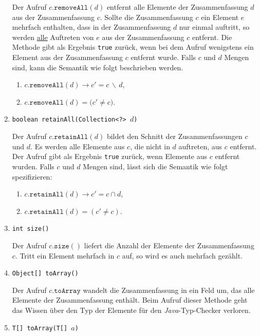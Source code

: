 \begin{enumerate}
      Der Aufruf $c.\mathtt{removeAll}(d)$ entfernt alle Elemente der Zusammenfassung $d$
      aus der Zusammenfassung $c$.  Sollte die Zusammenfassung $c$ ein Element $e$ mehrfach
      enthalten, dass in der Zusammenfassung $d$ nur einmal auftritt, so werden
      \underline{alle} Auftreten von $e$ aus der Zusammenfassung $c$ entfernt.  Die Methode gibt als Ergebnis
      \texttt{true} zur\"uck, wenn bei dem Aufruf wenigstens ein Element aus der
      Zusammenfassung $c$ entfernt wurde.
      Falls $c$ und $d$ Mengen sind, kann die Semantik wie folgt beschrieben werden.
      \begin{enumerate}
      \item $c.\mathtt{removeAll}(d) \rightarrow c' = c \,\backslash\, d$,
      \item $c.\mathtt{removeAll}(d) = \bigl(c' \not= c\bigr)$.
      \end{enumerate}
\item \texttt{boolean retainAll(Collection<?> $d$)}

      Der Aufruf $c.\mathtt{retainAll}(d)$ bildet den Schnitt der Zusammenfassungen
      $c$ und $d$.  Es werden alle Elemente aus $c$, die nicht in $d$ auftreten, aus $c$
      entfernt.  Der Aufruf gibt als Ergebnis \texttt{true} zur\"uck, wenn Elemente aus 
      $c$ entfernt wurden.  Falls $c$ und $d$ Mengen sind, l\"asst sich die Semantik wie
      folgt spezifizieren:
      \begin{enumerate}
      \item $c.\mathtt{retainAll}(d) \rightarrow c' = c \cap d$,
      \item $c.\mathtt{retainAll}(d) = (c' \not= c)$.
      \end{enumerate}
\item \texttt{int size()}

      Der Aufruf $c.\mathtt{size}()$ liefert die Anzahl der Elemente der Zusammenfassung
      $c$.  Tritt ein Element mehrfach in $c$ auf, so wird es auch mehrfach gez\"ahlt.
\item \texttt{Object[] toArray()}
  
      Der Aufruf $c.\mathtt{toArray}$ wandelt die Zusammenfassung in ein Feld um,
      das alle Elemente der Zusammenfassung enth\"alt.  Beim Aufruf dieser Methode geht das
      Wissen \"uber den Typ der Elemente f\"ur den \textsl{Java}-Typ-Checker verloren.

\item \texttt{T[] toArray(T[] $a$)}


\end{enumerate}
